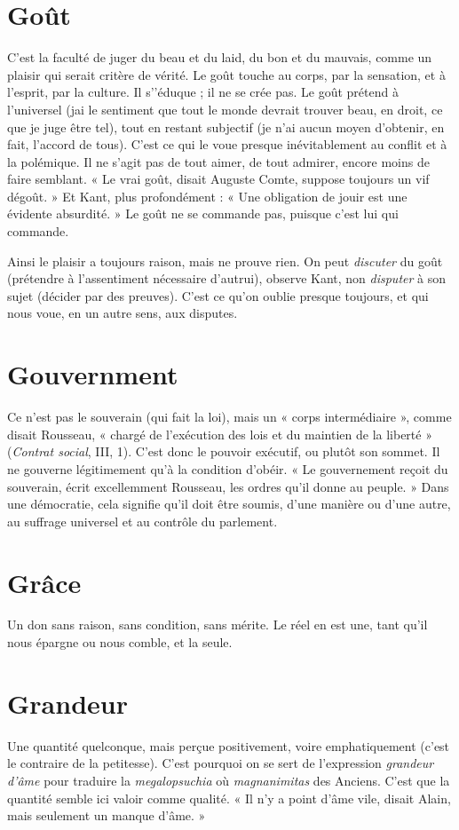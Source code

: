 \section{Goût}
C'est la faculté de juger du beau et du laid, du bon et du mauvais,
comme un plaisir qui serait critère de vérité. Le goût touche au
corps, par la sensation, et à l'esprit, par la culture. Il s’'éduque ; il ne se crée pas.
Le goût prétend à l’universel (jai le sentiment que tout le monde devrait trouver
beau, en droit, ce que je juge être tel), tout en restant subjectif (je n’ai aucun moyen
d'obtenir, en fait, l'accord de tous). C’est ce qui le voue presque inévitablement au
conflit et à la polémique. Il ne s’agit pas de tout aimer, de tout admirer, encore
moins de faire semblant. « Le vrai goût, disait Auguste Comte, suppose toujours un
vif dégoût. » Et Kant, plus profondément : « Une obligation de jouir est une évidente
absurdité. » Le goût ne se commande pas, puisque c’est lui qui commande.

Ainsi le plaisir a toujours raison, mais ne prouve rien. On peut {\it discuter} du
goût (prétendre à l’assentiment nécessaire d’autrui), observe Kant, non {\it disputer}
à son sujet (décider par des preuves). C’est ce qu’on oublie presque toujours, et
qui nous voue, en un autre sens, aux disputes.

\section{Gouvernment}
Ce n'est pas le souverain (qui fait la loi), mais un
« corps intermédiaire », comme disait Rousseau, « chargé
de l'exécution des lois et du maintien de la liberté » ({\it Contrat social}, III, 1). C’est
donc le pouvoir exécutif, ou plutôt son sommet. Il ne gouverne légitimement
qu’à la condition d’obéir. « Le gouvernement reçoit du souverain, écrit excellemment
Rousseau, les ordres qu’il donne au peuple. » Dans une démocratie,
cela signifie qu’il doit être soumis, d’une manière ou d’une autre, au suffrage
universel et au contrôle du parlement.

\section{Grâce}
Un don sans raison, sans condition, sans mérite. Le réel en est une,
tant qu’il nous épargne ou nous comble, et la seule.

\section{Grandeur}
Une quantité quelconque, mais perçue positivement, voire
emphatiquement (c’est le con\-traire de la petitesse). C’est
pourquoi on se sert de l’expression {\it grandeur d'âme} pour traduire la {\it megalopsuchia}
où {\it magnanimitas} des Anciens. C’est que la quantité semble ici valoir
comme qualité. « Il n’y a point d'âme vile, disait Alain, mais seulement un
manque d'âme. »

